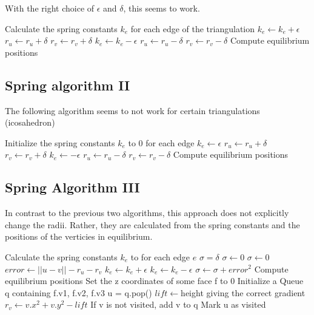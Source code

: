 \documentclass{article}
\begin{document}
With the right choice of $\epsilon$ and $\delta$, this seems to work.\\

\newpage

\begin{algorithmic}
\State Calculate the spring constants $k_e$ for each edge of the triangulation
						\State $k_e\gets k_e + \epsilon$
						\State $r_u\gets r_u + \delta$
						\State $r_v\gets r_v + \delta$
						\State $k_e\gets k_e - \epsilon$
						\State $r_u\gets r_u - \delta$
						\State $r_v\gets r_v - \delta$
				\EndIf
		\EndFor
		\State Compute equilibrium positions
\EndWhile
\end{algorithmic}

\subsection{Spring algorithm II}
The following algorithm seems to not work for certain triangulations (icosahedron) \\


\begin{algorithmic}
\State Initialize the spring constants $k_e$ to 0 for each edge
						\State $k_e\gets \epsilon$
						\State $r_u\gets r_u + \delta$
						\State $r_v\gets r_v + \delta$
						\State $k_e\gets -\epsilon$
						\State $r_u\gets r_u - \delta$
						\State $r_v\gets r_v - \delta$
				\EndIf
		\EndFor
		\State Compute equilibrium positions
\EndWhile
\end{algorithmic}	

\subsection{Spring Algorithm III}
In contrast to the previous two algorithms, this approach does not explicitly change the radii. Rather, they are calculated from the spring constants and the positions of the verticies in equilibrium.

\newpage

\begin{algorithmic}
\State Calculate the spring constants $k_e$ to for each edge $e$
\State $\sigma = \delta$
\While {$\sigma \geq \delta$}
		\State $\sigma \gets 0$
				\State $\sigma \gets 0$
				\State $error\gets ||u-v|| - r_u - r_v$
						\State $k_e\gets k_e + \epsilon$
						\State $k_e\gets k_e - \epsilon$
				\EndIf
				\State $\sigma \gets \sigma + error^2$
		\EndFor
		\State Compute equilibrium positions
		\State Set the z coordinates of some face f to 0
		\State Initialize a Queue q containing f.v1, f.v2, f.v3
				\State u = q.pop()
						\State $lift\gets $height giving the correct gradient
						\State $r_v\gets v.x^2 + v.y^2 - lift$
						\State If v is not visited, add v to q
				\EndFor
				\State Mark u as visited
		\EndWhile
\EndWhile
\end{algorithmic}	
\end{document}
